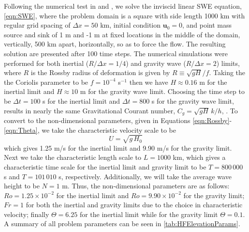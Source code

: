   Following the numerical test in \cite{Hanert2002} and \cite{Batteen1981}, we
  solve the inviscid linear SWE equation, \eqref{eqn:SWE}, where the problem
  domain is a square with side length 1000 km with regular grid spacing of
  $\Delta x=50$ km, initial condition $\mathbf{u}_0 = 0$, and point mass source
  and sink of 1 m and -1 m at fixed locations in the middle of the domain,
  vertically, 500 km apart, horizontally, so as to force the flow.  The
  resulting solution are presented after 100 time steps. The numerical
  simulations were performed for both inertial ($R/\Delta x = 1/4$) and gravity
  wave ($R/\Delta x = 2$) limits, where $R$ is the Rossby radius of deformation
  is given by $R \equiv \sqrt{gH}/f$. Taking the the Coriolis parameter to be $f
  = 10^{-4}$ s$^{-1}$ then we have $H \approx 0.16$ m for the inertial limit and
  $H \approx 10$ m for the gravity wave limit. Choosing the time step to be
  $\Delta t = 100$ s for the inertial limit and $\Delta t = 800$ s for the
  gravity wave limit, results in nearly the same Gravitational Courant number,
  $C_g = \sqrt{gH}\,k/h$, \cite{Le-Roux1998}. To convert to the non-dimensional
  parameters, given in Equations \ref{eqn:Rossby}-\ref{eqn:Theta}, we take the
  characteristic velocity scale to be
  \begin{equation}
    U = \sqrt{g\,H_0}
    \label{eqn:VelocityScale}
  \end{equation}
  which gives 1.25 m/s for the inertial limit and 9.90 m/s for the gravity limit.
  Next we take the characteristic length scale to $L = 1000$ km, which gives a
  characteristic time scale for the inertial limit and gravity limit to be
  $T=800\,000$ s and $T=101\,010$ s, respectively. Additionally, we will take the
  average wave height to be $N=1$ m. Thus, the non-dimensional parameters are as
  follows: $Ro = 1.25\times10^{-2}$ for the inertial limit and
  $Ro=9.90\times10^{-2}$ for the gravity limit; $Fr = 1$ for both the inertial
  and gravity limits due to the choice in characteristic velocity;
  finally $\Theta = 6.25$ for the inertial limit while for the gravity limit
  $\Theta = 0.1$. A summary of all problem parameters can be seen in
  \autoref{tab:HFElevationParams}.

